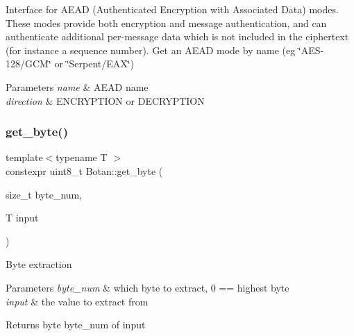 Interface for A\+E\+AD (Authenticated Encryption with Associated Data) modes. These modes provide both encryption and message authentication, and can authenticate additional per-\/message data which is not included in the ciphertext (for instance a sequence number). Get an A\+E\+AD mode by name (eg \char`\"{}\+A\+E\+S-\/128/\+G\+C\+M\char`\"{} or \char`\"{}\+Serpent/\+E\+A\+X\char`\"{}) 
\begin{DoxyParams}{Parameters}
{\em name} & A\+E\+AD name \\
\hline
{\em direction} & E\+N\+C\+R\+Y\+P\+T\+I\+ON or D\+E\+C\+R\+Y\+P\+T\+I\+ON \\
\hline
\end{DoxyParams}
\mbox{\label{namespace_botan_ad10dc938a651323dddbfe3c1e985774b}} 
\subsubsection{\texorpdfstring{get\+\_\+byte()}{get\_byte()}}
{\footnotesize\ttfamily template$<$typename T $>$ \\
constexpr uint8\+\_\+t Botan\+::get\+\_\+byte (\begin{DoxyParamCaption}\item[{size\+\_\+t}]{byte\+\_\+num,  }\item[{T}]{input }\end{DoxyParamCaption})\hspace{0.3cm}{\ttfamily [inline]}}

Byte extraction 
\begin{DoxyParams}{Parameters}
{\em byte\+\_\+num} & which byte to extract, 0 == highest byte \\
\hline
{\em input} & the value to extract from \\
\hline
\end{DoxyParams}
\begin{DoxyReturn}{Returns}
byte byte\+\_\+num of input 
\end{DoxyReturn}
\mbox{\label{namespace_botan_a9074784e382345388cdeb6db3e69c823}} 

